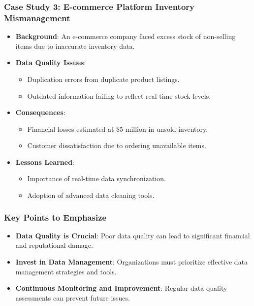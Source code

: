 \documentclass{beamer}
\begin{document}
\begin{frame}[fragile]
    \frametitle{Case Study 3: E-commerce Platform Inventory Mismanagement}
    \begin{itemize}
        \item \textbf{Background}: An e-commerce company faced excess stock of non-selling items due to inaccurate inventory data.
        \item \textbf{Data Quality Issues}:
            \begin{itemize}
                \item Duplication errors from duplicate product listings.
                \item Outdated information failing to reflect real-time stock levels.
            \end{itemize}
        \item \textbf{Consequences}:
            \begin{itemize}
                \item Financial losses estimated at \$5 million in unsold inventory.
                \item Customer dissatisfaction due to ordering unavailable items.
            \end{itemize}
        \item \textbf{Lessons Learned}:
            \begin{itemize}
                \item Importance of real-time data synchronization.
                \item Adoption of advanced data cleaning tools.
            \end{itemize}
    \end{itemize}
\end{frame}

\begin{frame}[fragile]
    \frametitle{Key Points to Emphasize}
    \begin{itemize}
        \item \textbf{Data Quality is Crucial}: Poor data quality can lead to significant financial and reputational damage.
        \item \textbf{Invest in Data Management}: Organizations must prioritize effective data management strategies and tools.
        \item \textbf{Continuous Monitoring and Improvement}: Regular data quality assessments can prevent future issues.
    \end{itemize}
\end{frame}
\end{document}
